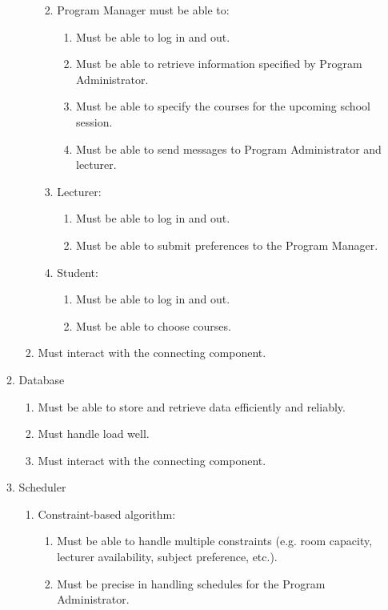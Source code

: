 \documentclass[12pt]{article}
\begin{document}
\begin{enumerate}
\begin{enumerate}
\begin{enumerate}
\begin{enumerate}
\begin{enumerate}
		    \end{enumerate}
		\item Program Manager must be able to:
			\begin{enumerate}
		   \item Must be able to log in and out.
		   \item Must be able to retrieve information specified by Program Administrator.
		   \item Must be able to specify the courses for the upcoming school session.
		   \item Must be able to send messages to Program Administrator and lecturer.
		   \end{enumerate}
		\item Lecturer:
			\begin{enumerate}
			\item Must be able to log in and out.
			\item Must be able to submit preferences to the Program Manager.
			\end{enumerate}
		\item Student:
			\begin{enumerate}
		   \item Must be able to log in and out.
		   \item Must be able to choose courses.
		   \end{enumerate}
		\end{enumerate}
	\item Must interact with the connecting component.
	\end{enumerate}
\item Database
	\begin{enumerate}
	\item Must be able to store and retrieve data efficiently and reliably.
	\item Must handle load well.
	\item Must interact with the connecting component.
	\end{enumerate}
\item Scheduler
      \begin{enumerate}
      \item Constraint-based algorithm:
      	    \begin{enumerate}
            \item Must be able to handle multiple constraints (e.g. room capacity, lecturer availability, subject preference, etc.).
	    \item Must be precise in handling schedules for the Program Administrator.

\end{enumerate}
\end{enumerate}
\end{enumerate}
\end{enumerate}
\end{document}
